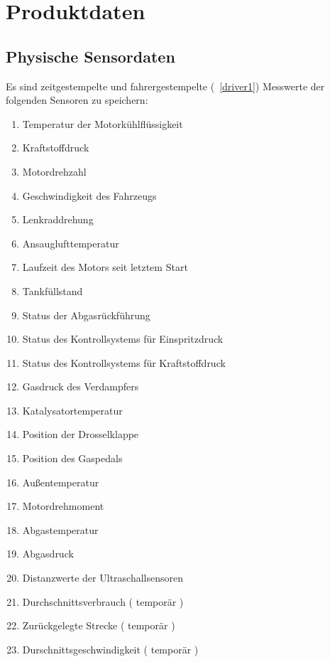 \documentclass[pflichtenheft.tex]{subfiles}
\begin{document}
\chapter{Produktdaten}

\renewcommand{\theenumi}{/PD\ifnum \value{enumi}<10 0\fi\arabic{enumi}0/}
\renewcommand{\labelenumi}{\theenumi}
\renewcommand{\theenumii}{\arabic{enumii}}
\renewcommand{\labelenumii}{PD\ifnum \value{enumi}<10 0\fi\arabic{enumi}\arabic{enumii}/}

\section{Physische Sensordaten}
Es sind zeitgestempelte und fahrergestempelte (~\ref{driver1}) Messwerte der folgenden Sensoren zu speichern:
\begin{enumerate}
\item
Temperatur der Motorkühlflüssigkeit
\item
Kraftstoffdruck
\item
Motordrehzahl
\item
Geschwindigkeit des Fahrzeugs
\item
Lenkraddrehung
\item
Ansauglufttemperatur 
\item
Laufzeit des Motors seit letztem Start
\item
Tankfüllstand
\item
Status der Abgasrückführung
\item
Status des Kontrollsystems für Einspritzdruck
\item
Status des Kontrollsystems für Kraftstoffdruck
\item
Gasdruck des Verdampfers
\item
Katalysatortemperatur
\item
Position der Drosselklappe
\item
Position des Gaspedals
\item
Außentemperatur
\item
Motordrehmoment
\item
Abgastemperatur
\item
Abgasdruck
\item
Distanzwerte der Ultraschallsensoren
\item Durchschnittsverbrauch ( temporär )
\item Zurückgelegte Strecke ( temporär )
\item Durschnittsgeschwindigkeit ( temporär )
\setcounter{enumTemp}{\value{enumi}}
\end{enumerate}
\end{document}
